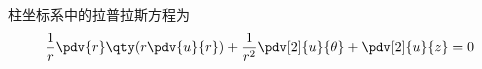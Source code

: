 

柱坐标系中的拉普拉斯方程为
\begin{equation}
\frac{1}{r} \pdv{r} \qty(r\pdv{u}{r}) + \frac{1}{r^2} \pdv[2]{u}{\theta} + \pdv[2]{u}{z} = 0
\end{equation}
